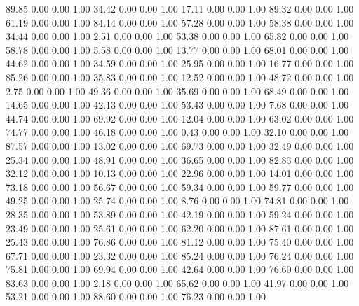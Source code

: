    89.85   0.00   0.00   1.00
   34.42   0.00   0.00   1.00
   17.11   0.00   0.00   1.00
   89.32   0.00   0.00   1.00
   61.19   0.00   0.00   1.00
   84.14   0.00   0.00   1.00
   57.28   0.00   0.00   1.00
   58.38   0.00   0.00   1.00
   34.44   0.00   0.00   1.00
    2.51   0.00   0.00   1.00
   53.38   0.00   0.00   1.00
   65.82   0.00   0.00   1.00
   58.78   0.00   0.00   1.00
    5.58   0.00   0.00   1.00
   13.77   0.00   0.00   1.00
   68.01   0.00   0.00   1.00
   44.62   0.00   0.00   1.00
   34.59   0.00   0.00   1.00
   25.95   0.00   0.00   1.00
   16.77   0.00   0.00   1.00
   85.26   0.00   0.00   1.00
   35.83   0.00   0.00   1.00
   12.52   0.00   0.00   1.00
   48.72   0.00   0.00   1.00
    2.75   0.00   0.00   1.00
   49.36   0.00   0.00   1.00
   35.69   0.00   0.00   1.00
   68.49   0.00   0.00   1.00
   14.65   0.00   0.00   1.00
   42.13   0.00   0.00   1.00
   53.43   0.00   0.00   1.00
    7.68   0.00   0.00   1.00
   44.74   0.00   0.00   1.00
   69.92   0.00   0.00   1.00
   12.04   0.00   0.00   1.00
   63.02   0.00   0.00   1.00
   74.77   0.00   0.00   1.00
   46.18   0.00   0.00   1.00
    0.43   0.00   0.00   1.00
   32.10   0.00   0.00   1.00
   87.57   0.00   0.00   1.00
   13.02   0.00   0.00   1.00
   69.73   0.00   0.00   1.00
   32.49   0.00   0.00   1.00
   25.34   0.00   0.00   1.00
   48.91   0.00   0.00   1.00
   36.65   0.00   0.00   1.00
   82.83   0.00   0.00   1.00
   32.12   0.00   0.00   1.00
   10.13   0.00   0.00   1.00
   22.96   0.00   0.00   1.00
   14.01   0.00   0.00   1.00
   73.18   0.00   0.00   1.00
   56.67   0.00   0.00   1.00
   59.34   0.00   0.00   1.00
   59.77   0.00   0.00   1.00
   49.25   0.00   0.00   1.00
   25.74   0.00   0.00   1.00
    8.76   0.00   0.00   1.00
   74.81   0.00   0.00   1.00
   28.35   0.00   0.00   1.00
   53.89   0.00   0.00   1.00
   42.19   0.00   0.00   1.00
   59.24   0.00   0.00   1.00
   23.49   0.00   0.00   1.00
   25.61   0.00   0.00   1.00
   62.20   0.00   0.00   1.00
   87.61   0.00   0.00   1.00
   25.43   0.00   0.00   1.00
   76.86   0.00   0.00   1.00
   81.12   0.00   0.00   1.00
   75.40   0.00   0.00   1.00
   67.71   0.00   0.00   1.00
   23.32   0.00   0.00   1.00
   85.24   0.00   0.00   1.00
   76.24   0.00   0.00   1.00
   75.81   0.00   0.00   1.00
   69.94   0.00   0.00   1.00
   42.64   0.00   0.00   1.00
   76.60   0.00   0.00   1.00
   83.63   0.00   0.00   1.00
    2.18   0.00   0.00   1.00
   65.62   0.00   0.00   1.00
   41.97   0.00   0.00   1.00
   53.21   0.00   0.00   1.00
   88.60   0.00   0.00   1.00
   76.23   0.00   0.00   1.00
